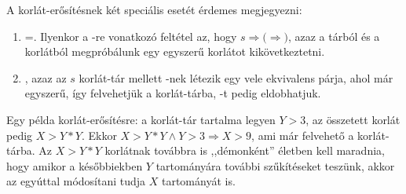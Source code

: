 \label{erosit}


A korlát-erősítésnek két speciális esetét érdemes megjegyezni:

\begin{enumerate}
\item {}=. Ilyenkor a -re vonatkozó feltétel az, hogy
$s\Rightarrow($$\Rightarrow$$)$, azaz a tárból és a  korlátból
megpróbálunk egy egyszerű  korlátot kikövetkeztetni.
\item {}, azaz az $s$ korlát-tár mellett -nek létezik egy
vele ekvivalens  párja, ahol  már egyszerű, így felvehetjük
a korlát-tárba, -t pedig eldobhatjuk.
\end{enumerate}

Egy példa korlát-erősítésre: a korlát-tár tartalma legyen ${Y>3}$, az
összetett korlát pedig $X>Y*Y$. Ekkor $X>Y*Y \land Y>3 \Rightarrow X>9$, ami már
felvehető a korlát-tárba. Az $X>Y*Y$ korlátnak továbbra is ,,démonként'' életben
kell maradnia, hogy amikor a későbbiekben $Y$ tartományára további szűkítéseket
teszünk, akkor az egyúttal módosítani tudja $X$ tartományát is.

